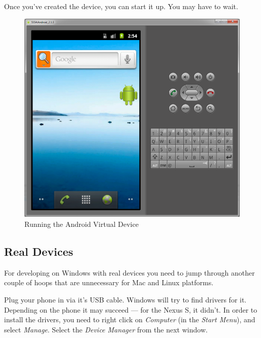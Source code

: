 Once you've created the device, you can start it up. You may have to wait.

\begin{figure}[!ht]
  \includegraphics[width=\textwidth]{./images/avd.png}%
  \caption{Running the Android Virtual Device}
  \label{fig:avd}
\end{figure}

\clearpage

\subsection{Real Devices}

For developing on Windows with real devices you need to jump through another couple of hoops that are unnecessary for Mac and Linux platforms.

Plug your phone in via it's USB cable. Windows will try to find drivers for it. Depending on the phone it may succeed --- for the Nexus S, it didn't. In order to install the drivers, you need to right click on \textit{Computer} (in the \textit{Start Menu}), and select \textit{Manage}. Select the \textit{Device Manager} from the next window. 

